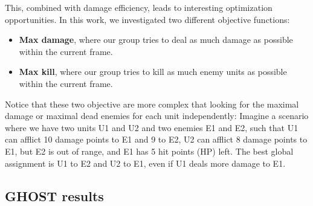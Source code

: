\documentclass[journal]{IEEEtran}
\newcommand{\ghost}{\textsc{GHOST}\xspace}
\begin{document}
This,   combined  with   damage  efficiency,   leads  to   interesting
optimization  opportunities.   In  this  work,  we   investigated  two
different objective functions:
\begin{itemize}
\item {\bf Max  damage}, where our group tries to  deal as much damage
  as possible within the current frame.
\item {\bf  Max kill},  where our  group tries to  kill as  much enemy
  units as possible within the current frame.
\end{itemize}
Notice that these two objective are  more complex that looking for the
maximal damage  or maximal dead  enemies for each  unit independently:
Imagine a scenario where  we have two units U1 and  U2 and two enemies
E1 and E2,  such that U1 can afflict  10 damage points to E1  and 9 to
E2, U2 can afflict 8 damage points to  E1, but E2 is out of range, and
E1 has 5 hit points (HP) left.  The best global assignment is U1 to E2
and U2 to E1, even if U1 deals more damage to E1.

\subsection{\ghost results}
\end{document}
